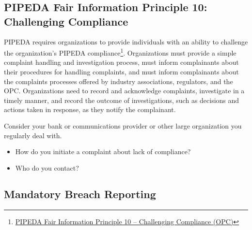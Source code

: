 \subsection*{PIPEDA Fair Information Principle 10: Challenging Compliance}

PIPEDA requires organizations to provide individuals with an ability to challenge the organization's PIPEDA compliance\footnote{\href{https://www.priv.gc.ca/en/privacy-topics/privacy-laws-in-canada/the-personal-information-protection-and-electronic-documents-act-pipeda/p_principle/principles/p_compliance/}{PIPEDA Fair Information Principle 10 -- Challenging Compliance (OPC)}}. Organizations must provide a simple complaint handling and investigation process, must inform complainants about their procedures for handling complaints, and must inform complainants about the complaints processes offered by industry associations, regulators, and the OPC. Organizations need to record and acknowledge complaints, investigate in a timely manner, and record the outcome of investigations, such as decisions and actions taken in response, as they notify the complainant. 

\begin{exercisebox}

Consider your bank or communications provider or other large organization you regularly deal with. 
\begin{itemize}
  \item How do you initiate a complaint about lack of compliance?
  \item Who do you contact?
\end{itemize}
\end{exercisebox}

\subsection*{Mandatory Breach Reporting}

